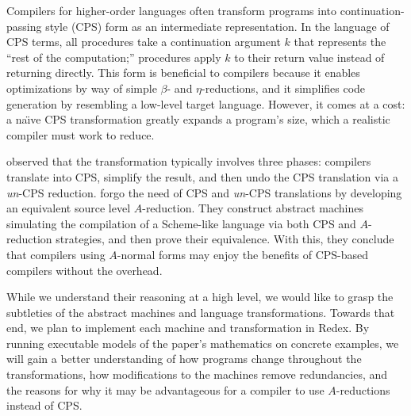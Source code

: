 \documentclass[11pt]{article}
\begin{document}
\thispagestyle{fancy}

Compilers for higher-order languages often transform programs into
continuation-passing style (CPS) form as an intermediate representation. In the
language of CPS terms, all procedures take a continuation argument $k$
that represents the ``rest of the computation;'' procedures apply $k$ to their
return value instead of returning directly. This form is beneficial to
compilers because it enables optimizations by way of simple $\beta$- and
$\eta$-reductions, and it simplifies code generation by resembling a low-level
target language.
However, it comes at a cost: a na\"{\i}ve CPS transformation greatly expands a
program's size, which a realistic compiler must work to reduce.

\citet{Sabry:1992zr} observed that the transformation typically involves three
phases: compilers translate into CPS, simplify the result, and then undo the
CPS translation via a \textit{un}-CPS reduction.
\citet{Flanagan:1993fk} forgo the need of CPS and \textit{un}-CPS translations
by developing an equivalent source level $A$-reduction. They construct abstract
machines simulating the compilation of a Scheme-like language via both CPS and
$A$-reduction strategies, and then prove their equivalence. With this, they
conclude that compilers using $A$-normal forms may enjoy the benefits of
CPS-based compilers without the overhead.

While we understand their reasoning at a high level, we would like to grasp
the subtleties of the abstract machines and language transformations.
Towards that end, we plan to implement each machine and transformation
in Redex. By running executable models of the paper's mathematics on concrete
examples, we will gain a better understanding of how programs change throughout
the transformations, how modifications to the machines remove redundancies, and
the reasons for why it may be advantageous for a compiler to use $A$-reductions
instead of CPS.
\end{document}
